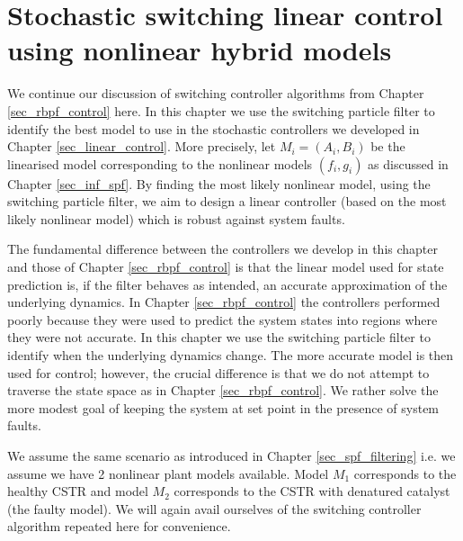 \chapter{Stochastic switching linear control using nonlinear hybrid models}
\label{sec_spf_control}
We continue our discussion of switching controller algorithms from Chapter \ref{sec_rbpf_control} here. In this chapter we use the switching particle filter to identify the best model to use in the stochastic controllers we developed in Chapter \ref{sec_linear_control}. More precisely, let $M_i = (A_i, B_i)$ be the linearised model corresponding to the nonlinear models $(f_i, g_i)$ as discussed in Chapter \ref{sec_inf_spf}. By finding the most likely nonlinear model, using the switching particle filter, we aim to design a linear controller (based on the most likely nonlinear model) which is robust against system faults.

The fundamental difference between the controllers we develop in this chapter and those of Chapter \ref{sec_rbpf_control} is that the linear model used for state prediction is, if the filter behaves as intended, an accurate approximation of the underlying dynamics. In Chapter \ref{sec_rbpf_control} the controllers performed poorly because they were used to predict the system states into regions where they were not accurate. In this chapter we use the switching particle filter to identify when the underlying dynamics change. The more accurate model is then used for control; however, the crucial difference is that we do not attempt to traverse the state space as in Chapter \ref{sec_rbpf_control}. We rather solve the more modest goal of keeping the system at set point in the presence of system faults. 

We assume the same scenario as introduced in Chapter \ref{sec_spf_filtering} i.e. we assume we have 2 nonlinear plant models available. Model $M_1$ corresponds to the healthy CSTR and model $M_2$ corresponds to the CSTR with denatured catalyst (the faulty model). We will again avail ourselves of the switching controller algorithm  repeated here for convenience.

